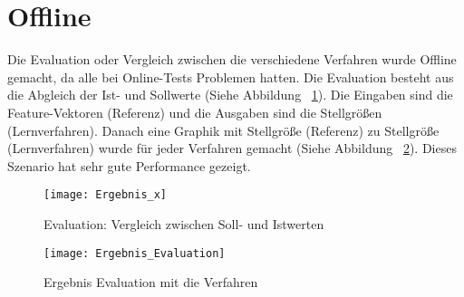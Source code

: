 

\section{Offline} %
\label{sec:Offline}
Die Evaluation oder Vergleich zwischen die verschiedene Verfahren wurde Offline gemacht, da alle bei Online-Tests Problemen hatten. Die Evaluation besteht aus die Abgleich der Ist- und Sollwerte (Siehe Abbildung ~\ref{fig:Ergebnis_x}). Die Eingaben sind die Feature-Vektoren (Referenz) und die Ausgaben sind die Stellgrößen (Lernverfahren). Danach eine Graphik mit Stellgröße (Referenz) zu Stellgröße (Lernverfahren) wurde für jeder Verfahren gemacht (Siehe Abbildung ~\ref{fig:Ergebnis_Evaluation}). Dieses Szenario hat sehr gute Performance gezeigt.

\begin{figure}[htbp]
\begin{center}
\texttt{[image: Ergebnis\_x]}
\caption{Evaluation: Vergleich zwischen Soll- und Istwerten}
\label{fig:Ergebnis_x}
\end{center}
\end{figure}

\begin{figure}[htbp]
\begin{center}
\texttt{[image: Ergebnis\_Evaluation]}
\caption{Ergebnis Evaluation mit die Verfahren}
\label{fig:Ergebnis_Evaluation}
\end{center}
\end{figure}


